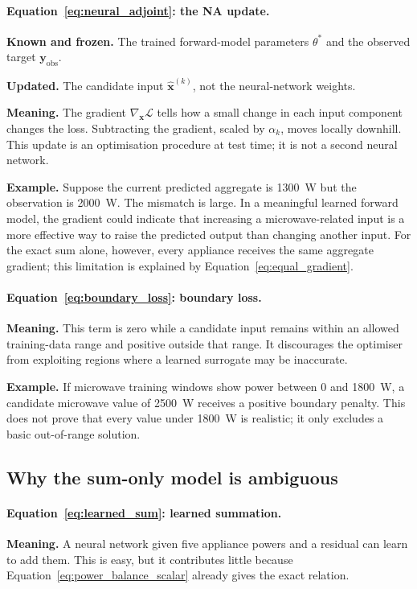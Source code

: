 \documentclass[11pt]{article}
\newcommand{\vect}[1]{\mathbf{#1}}
\begin{document}
\paragraph{Equation~\eqref{eq:neural_adjoint}: the NA update.}
\textbf{Known and frozen.} The trained forward-model parameters $\theta^\ast$ and the observed target $\vect{y}_{\mathrm{obs}}$.

\textbf{Updated.} The candidate input $\hat{\vect{x}}^{(k)}$, not the neural-network weights.

\textbf{Meaning.} The gradient $\nabla_{\vect{x}}\mathcal{L}$ tells how a small change in each input component changes the loss. Subtracting the gradient, scaled by $\alpha_k$, moves locally downhill. This update is an optimisation procedure at test time; it is not a second neural network.

\textbf{Example.} Suppose the current predicted aggregate is 1300~W but the observation is 2000~W. The mismatch is large. In a meaningful learned forward model, the gradient could indicate that increasing a microwave-related input is a more effective way to raise the predicted output than changing another input. For the exact sum alone, however, every appliance receives the same aggregate gradient; this limitation is explained by Equation~\eqref{eq:equal_gradient}.

\paragraph{Equation~\eqref{eq:boundary_loss}: boundary loss.}
\textbf{Meaning.} This term is zero while a candidate input remains within an allowed training-data range and positive outside that range. It discourages the optimiser from exploiting regions where a learned surrogate may be inaccurate.

\textbf{Example.} If microwave training windows show power between 0 and 1800~W, a candidate microwave value of 2500~W receives a positive boundary penalty. This does not prove that every value under 1800~W is realistic; it only excludes a basic out-of-range solution.

\subsection{Why the sum-only model is ambiguous}

\paragraph{Equation~\eqref{eq:learned_sum}: learned summation.}
\textbf{Meaning.} A neural network given five appliance powers and a residual can learn to add them. This is easy, but it contributes little because Equation~\eqref{eq:power_balance_scalar} already gives the exact relation.
\end{document}
